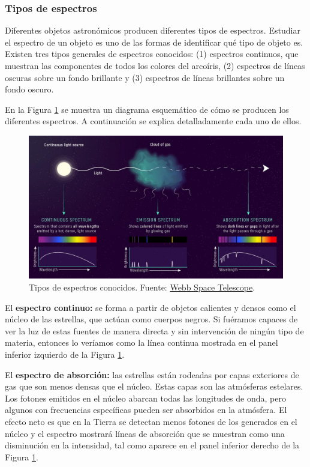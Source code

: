 \subsubsection{Tipos de espectros}
Diferentes objetos astronómicos producen diferentes tipos de espectros. Estudiar el espectro de un objeto es uno de las formas de identificar qué tipo de objeto es. Existen tres tipos generales de espectros conocidos: (1) espectros continuos, que muestran las componentes de todos los colores del arcoíris, (2) espectros de líneas oscuras sobre un fondo brillante y (3) espectros de líneas brillantes sobre un fondo oscuro. 

En la Figura \ref{fig:types-spectra} se muestra un diagrama esquemático de cómo se producen los diferentes espectros. A continuación se explica detalladamente cada uno de ellos.

\begin{figure}[htb]
  \centering
				\includegraphics[width=\textwidth]{figures/types-of-spectra}
				\caption{Tipos de espectros conocidos. Fuente: \href{https://webbtelescope.org/contents/media/images/01F8GF8DK2PRY4FP9DA2XPQC8S}{Webb Space Telescope}.}
				\label{fig:types-spectra} 
\end{figure}

El \textbf{espectro continuo:} se forma a partir de objetos calientes y densos como el núcleo de las estrellas, que actúan como cuerpos negros. Si fuéramos capaces de ver la luz de estas fuentes de manera directa y sin intervención de ningún tipo de materia, entonces lo veríamos como la línea continua mostrada en el panel inferior izquierdo de la Figura \ref{fig:types-spectra}. 

El \textbf{espectro de absorción:} las estrellas están rodeadas por capas exteriores de gas que son menos densas que el núcleo. Estas capas son las atmósferas estelares. Los fotones emitidos en el núcleo abarcan todas las longitudes de onda, pero algunos con frecuencias específicas pueden ser absorbidos en la atmósfera. El efecto neto es que en la Tierra se detectan menos fotones de los generados en el núcleo y el espectro mostrará líneas de absorción que se muestran como una disminución en la intensidad, tal como aparece en el panel inferior derecho de la Figura \ref{fig:types-spectra}.

